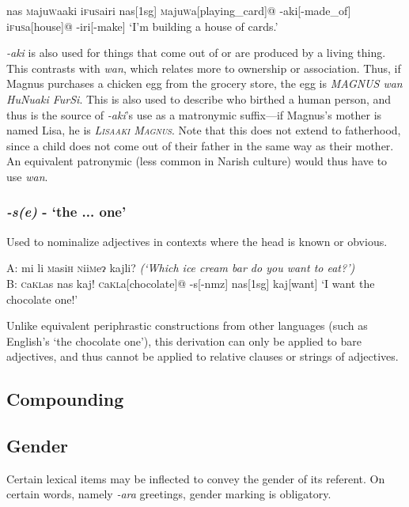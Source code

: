 \documentclass[a4paper,10pt,twoside,openright]{memoir}
\newcommand{\lilglot}{ɂ}
\newcommand{\famwordold}[5]{#1\textsc{#2}#3\textsc{#4}#5}
\newcommand\famword[1]{{\addfontfeatures{Letters=UppercaseSmallCaps}#1}}
\begin{document}
\ex
\begingl
\glpreamble%
nas \famwordold{}{m}{aju}{w}{aaki} \famwordold{i}{f}{u}{s}{airi}%
\endpreamble%
nas[\sc 1sg]
\famwordold{}{m}{aju}{w}{a}[playing\_card]@
-aki[-made\_of]
\famwordold{i}{f}{u}{s}{a}[house]@
-iri[-make]
\glft `I'm building a house of cards.'
\endgl
\xe

\emph{-aki} is also used for things that come out of or are produced by a living thing. This contrasts with \emph{wan}, which relates more to ownership or association. Thus, if Magnus purchases a chicken egg from the grocery store, the egg is \textit{M\famword{AGNUS wan HuNuaki FurSi}}. This is also used to describe who birthed a human person, and thus is the source of \textit{-aki}'s use as a matronymic suffix---if Magnus's mother is named Lisa, he is \textit{\textsc{Lisaaki Magnus}}. Note that this does not extend to fatherhood, since a child does not come out of their father in the same way as their mother. An equivalent patronymic (less common in Narish culture) would thus have to use \textit{wan}.

\subsubsection{\emph{-s(e)} - `the ... one'}

Used to nominalize adjectives in contexts where the head is known or obvious.

\ex
\begingl
\glpreamble
A: mi li \famwordold{}{m}{asi}{h}{} \famwordold{}{n}{ii}{m}{e\lilglot} kajli? \textit{(`Which ice cream bar do you want to eat?')}\\
B: \famwordold{}{c}{a}{kl}{as} nas kaj!%
\endpreamble
\famwordold{}{c}{a}{kl}{a}[chocolate]@
-s[\sc -nmz]
nas[\sc 1sg]
kaj[want]
\glft `I want the chocolate one!'
\endgl
\xe

Unlike equivalent periphrastic constructions from other languages (such as English's `the chocolate one'), this derivation can only be applied to bare adjectives, and thus cannot be applied to relative clauses or strings of adjectives.

\subsection{Compounding}

\subsection{Gender}

Certain lexical items may be inflected to convey the gender of its referent. On certain words, namely \emph{-ara} greetings, gender marking is obligatory.
\end{document}
